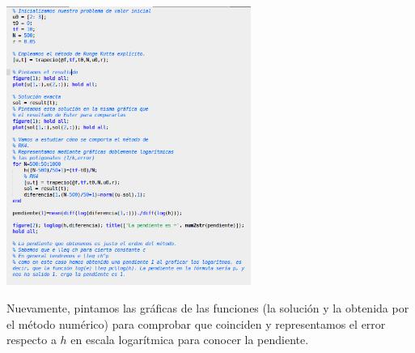 \begin{center}
\includegraphics[width=0.6\textwidth]{img/PVI_trapecio.png}
\end{center}

Nuevamente, pintamos las gráficas de las funciones (la solución y la obtenida por el método numérico) para comprobar que coinciden y representamos el error respecto a $h$ en escala logarítmica para conocer la pendiente.

